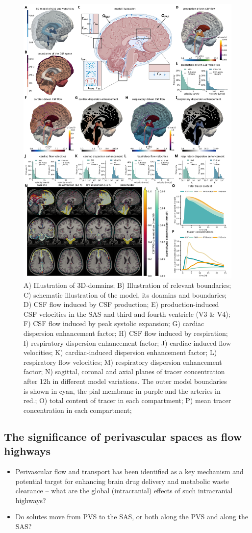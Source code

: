 \documentclass[fleqn,10pt]{wlscirep}
\begin{document}
\begin{figure}[h!]
\centering 
\includegraphics[width = 0.9\linewidth]{figures/figure2.png}
\caption{
A) Illustration of 3D-domains; 
B) Illustration of relevant boundaries; 
C) schematic illustration of the model, its doamins and boundaries; 
D) CSF flow induced by CSF production; 
E) production-induced CSF velocities in the SAS and third and fourth ventricle (V3 \& V4); 
F) CSF flow induced by peak systolic expansion; 
G) cardiac dispersion enhancement factor;
H) CSF flow induced by respiration; 
I) respiratory dispersion enhancement factor;
J) cardiac-induced flow velocities;
K) cardiac-induced dispersion enhancement factor;
L) respiratory flow velocities;
M) respiratory dispersion enhancement factor;
N) sagittal, coronal and axial planes of tracer concentration after 12h in different model variations. The outer model boundaries is shown in cyan, the pial membrane in purple and the arteries in red.;
O) total content of tracer in each compartment;
P) mean tracer concentration in each compartment;
}
\label{fig:csf}
\end{figure}  

\subsection*{The significance of perivascular spaces as flow highways}
\begin{itemize}
\item
  Perivascular flow and transport has been identified as a key
  mechanism and potential target for enhancing brain drug delivery and
  metabolic waste clearance -- what are the global (intracranial)
  effects of such intracranial highways? 
\item
  Do solutes move from PVS to the SAS, or both along the PVS and along
  the SAS?
\end{itemize}
\end{document}
